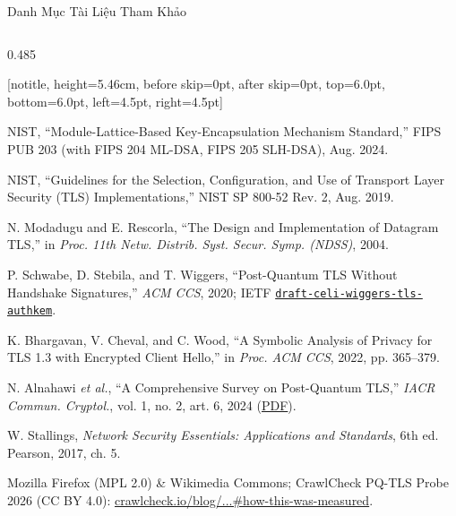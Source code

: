 \documentclass[aspectratio=169, 10pt]{beamer}
\begin{document}
\begin{frame}{Danh Mục Tài Liệu Tham Khảo}
\begin{columns}[T]
		\begin{column}{0.485\textwidth}
			\begin{accentcard}[uetblue]{}[notitle, height=5.46cm, before skip=0pt, after skip=0pt, top=6.0pt, bottom=6.0pt, left=4.5pt, right=4.5pt]
				\raggedright
				\begin{list}{}{%
					\setlength{\leftmargin}{13.5pt}%
					\setlength{\labelwidth}{11pt}%
					\setlength{\labelsep}{2.5pt}%
					\setlength{\itemindent}{0pt}%
					\setlength{\itemsep}{3.6pt}%
					\setlength{\parsep}{0pt}%
					\setlength{\topsep}{0pt}%
					\fontsize{4.85pt}{6.25pt}\selectfont%
				}
					\item[\color{uetblue}\textbf{[9]}] NIST, ``Module-Lattice-Based Key-Encapsulation Mechanism Standard,'' FIPS PUB 203 (with FIPS 204 ML-DSA, FIPS 205 SLH-DSA), Aug. 2024.
					\item[\color{uetblue}\textbf{[10]}] NIST, ``Guidelines for the Selection, Configuration, and Use of Transport Layer Security (TLS) Implementations,'' NIST SP 800-52 Rev. 2, Aug. 2019.
					\item[\color{uetblue}\textbf{[11]}] N. Modadugu and E. Rescorla, ``The Design and Implementation of Datagram TLS,'' in \textit{Proc. 11th Netw. Distrib. Syst. Secur. Symp. (NDSS)}, 2004.
					\item[\color{uetblue}\textbf{[12]}] P. Schwabe, D. Stebila, and T. Wiggers, ``Post-Quantum TLS Without Handshake Signatures,'' \textit{ACM CCS}, 2020; IETF \href{https://datatracker.ietf.org/doc/draft-celi-wiggers-tls-authkem/}{\texttt{draft-celi-wiggers-tls-authkem}}.
					\item[\color{uetblue}\textbf{[13]}] K. Bhargavan, V. Cheval, and C. Wood, ``A Symbolic Analysis of Privacy for TLS 1.3 with Encrypted Client Hello,'' in \textit{Proc. ACM CCS}, 2022, pp. 365--379.
					\item[\color{uetblue}\textbf{[14]}] N. Alnahawi \textit{et al.}, ``A Comprehensive Survey on Post-Quantum TLS,'' \textit{IACR Commun. Cryptol.}, vol. 1, no. 2, art. 6, 2024 (\href{https://cic.iacr.org/p/1/2/6/pdf}{PDF}).
					\item[\color{uetblue}\textbf{[15]}] W. Stallings, \textit{Network Security Essentials: Applications and Standards}, 6th ed. Pearson, 2017, ch. 5.
					\item[\color{uetblue}\textbf{[16]}] Mozilla Firefox (MPL 2.0) \& Wikimedia Commons; CrawlCheck PQ-TLS Probe 2026 (CC BY 4.0): \href{https://crawlcheck.io/blog/post-quantum-key-exchange-six-in-ten-websites-november-2026\#how-this-was-measured}{crawlcheck.io/blog/...\#how-this-was-measured}.
				\end{list}
			\end{accentcard}
		\end{column}
	\end{columns}
\end{frame}
\end{document}

